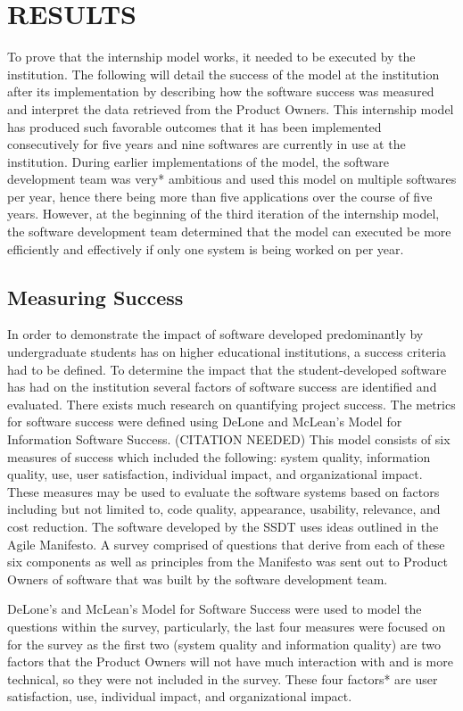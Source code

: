 \section{RESULTS}
To prove that the internship model works, it needed to be executed by the institution. The following will detail the success of the model at the institution after its implementation by describing how the software success was measured and interpret the data retrieved from the Product Owners.
This internship model has produced such favorable outcomes that it has been implemented consecutively for five years and nine softwares are currently in use at the institution. During earlier implementations of the model, the software development team was very* ambitious and used this model on multiple softwares per year, hence there being more than five applications over the course of five years. However, at the beginning of the third iteration of the internship model, the software development team determined that the model can executed be more efficiently and effectively if only one system is being worked on per year.

\subsection{Measuring Success}
In order to demonstrate the impact of software developed predominantly by undergraduate students has on higher educational institutions, a success criteria had to be defined. To determine the impact that the student-developed software has had on the institution several factors of software success are identified and evaluated.  There exists much research on quantifying project success. The metrics for software success were defined using DeLone and McLean’s Model for Information Software Success. (CITATION NEEDED) This model consists of six measures of success which included the following: system quality, information quality, use, user satisfaction, individual impact, and organizational impact. These measures may be used to evaluate the software systems based on factors including but not limited to, code quality, appearance, usability, relevance, and cost reduction. The software developed by the SSDT uses ideas outlined in the Agile Manifesto. A survey comprised of questions that derive from each of these six components as well as principles from the Manifesto was sent out to Product Owners of software that was built by the software development team.

DeLone's and McLean's Model for Software Success were used to model the questions within the survey, particularly, the last four measures were focused on for the survey as the first two (system quality and information quality) are two factors that the Product Owners will not have much interaction with and is more technical, so they were not included in the survey. These four factors* are user satisfaction, use, individual impact, and organizational impact.

